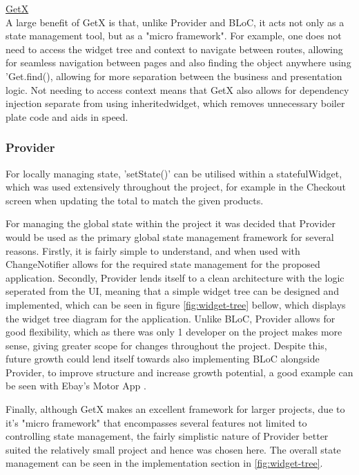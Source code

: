 \documentclass[12pt]{article}
\begin{document}
	\noindent \underline{GetX}
	\\
	\noindent
	A large benefit of GetX is that, unlike Provider and BLoC, it acts not only as a state management tool, but as a "micro framework". For example, one does not need to access the widget tree and context to navigate between routes, allowing for seamless navigation between pages and also finding the object anywhere using 'Get.find(), allowing for more separation between the business and presentation logic. Not needing to access context means that GetX also allows for dependency injection separate from using inheritedwidget, which removes unnecessary boiler plate code and aids in speed.

	
	\subsubsection{Provider}
	For locally managing state, 'setState()' can be utilised within a statefulWidget, which was used extensively throughout the project, for example in the Checkout screen when updating the total to match the given products.
	
	For managing the global state within the project it was decided that Provider would be used as the primary global state management framework for several reasons. Firstly, it is fairly simple to understand, and when used with ChangeNotifier allows for the required state management for the proposed application. Secondly, Provider lends itself to a clean architecture with the logic seperated from the UI, meaning that a simple widget tree can be designed and implemented, which can be seen in figure \ref{fig:widget-tree} bellow, which displays the widget tree diagram for the application. Unlike BLoC, Provider allows for good flexibility, which as there was only 1 developer on the project makes more sense, giving greater scope for changes throughout the project. Despite this, future growth could lend itself towards also implementing BLoC alongside Provider, to improve structure and increase growth potential, a good example can be seen with Ebay's Motor App \cite{techblogEBayMotorsState2021}.
	
	 Finally, although GetX makes an excellent framework for larger projects, due to it's "micro framework" that encompasses several features not limited to controlling state management, the fairly simplistic nature of Provider better suited the relatively small project and hence was chosen here. The overall state management can be seen in the implementation section in \ref{fig:widget-tree}.
	 	
\end{document}
